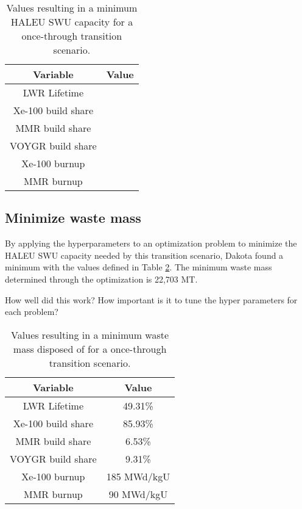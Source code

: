 \begin{table}
    \centering 
    \caption{Values resulting in a minimum \gls{HALEU} \gls{SWU} capacity for 
              a once-through transition scenario.}
    \label{tab:soga_ot_haleu}
    \begin{tabular}{c c}
        \hline
        Variable & Value \\
        \hline
        LWR Lifetime & \\
        Xe-100 build share & \\
        MMR build share & \\
        VOYGR build share & \\
        Xe-100 burnup & \\
        MMR burnup & \\
        \hline
    \end{tabular}
\end{table}

\subsection{Minimize waste mass}
By applying the hyperparameters to an optimization problem to minimize the 
\gls{HALEU} \gls{SWU} capacity needed by this transition scenario, Dakota
found a minimum with the values defined in Table \ref{tab:soga_ot_waste}.
The minimum waste mass determined through the optimization is 22,703 MT. 

How well did this work? How important is it to tune the hyper parameters 
for each problem?

\begin{table}
    \centering 
    \caption{Values resulting in a minimum waste mass disposed of for 
              a once-through transition scenario.}
    \label{tab:soga_ot_waste}
    \begin{tabular}{c c}
        \hline
        Variable & Value \\
        \hline
        LWR Lifetime & 49.31\%\\
        Xe-100 build share & 85.93\%\\
        MMR build share & 6.53\%\\
        VOYGR build share & 9.31\%\\
        Xe-100 burnup & 185 MWd/kgU\\
        MMR burnup & 90 MWd/kgU\\
        \hline
    \end{tabular}
\end{table}

